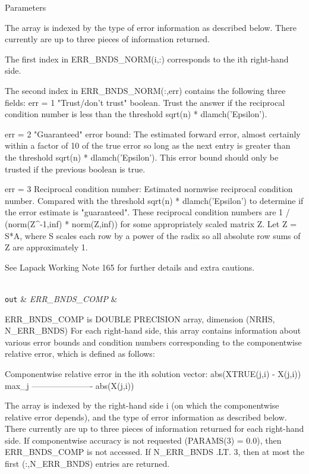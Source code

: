 \begin{DoxyParams}[1]{Parameters}
\begin{DoxyVerb}
     The array is indexed by the type of error information as described
     below. There currently are up to three pieces of information
     returned.

     The first index in ERR_BNDS_NORM(i,:) corresponds to the ith
     right-hand side.

     The second index in ERR_BNDS_NORM(:,err) contains the following
     three fields:
     err = 1 "Trust/don't trust" boolean. Trust the answer if the
              reciprocal condition number is less than the threshold
              sqrt(n) * dlamch('Epsilon').

     err = 2 "Guaranteed" error bound: The estimated forward error,
              almost certainly within a factor of 10 of the true error
              so long as the next entry is greater than the threshold
              sqrt(n) * dlamch('Epsilon'). This error bound should only
              be trusted if the previous boolean is true.

     err = 3  Reciprocal condition number: Estimated normwise
              reciprocal condition number.  Compared with the threshold
              sqrt(n) * dlamch('Epsilon') to determine if the error
              estimate is "guaranteed". These reciprocal condition
              numbers are 1 / (norm(Z^{-1},inf) * norm(Z,inf)) for some
              appropriately scaled matrix Z.
              Let Z = S*A, where S scales each row by a power of the
              radix so all absolute row sums of Z are approximately 1.

     See Lapack Working Note 165 for further details and extra
     cautions.\end{DoxyVerb}
\\
\hline
\mbox{\tt out}  & {\em E\+R\+R\+\_\+\+B\+N\+D\+S\+\_\+\+C\+O\+M\+P} & \begin{DoxyVerb}          ERR_BNDS_COMP is DOUBLE PRECISION array, dimension (NRHS, N_ERR_BNDS)
     For each right-hand side, this array contains information about
     various error bounds and condition numbers corresponding to the
     componentwise relative error, which is defined as follows:

     Componentwise relative error in the ith solution vector:
                    abs(XTRUE(j,i) - X(j,i))
             max_j ----------------------
                         abs(X(j,i))

     The array is indexed by the right-hand side i (on which the
     componentwise relative error depends), and the type of error
     information as described below. There currently are up to three
     pieces of information returned for each right-hand side. If
     componentwise accuracy is not requested (PARAMS(3) = 0.0), then
     ERR_BNDS_COMP is not accessed.  If N_ERR_BNDS .LT. 3, then at most
     the first (:,N_ERR_BNDS) entries are returned.


\end{DoxyVerb}
\end{DoxyParams}
